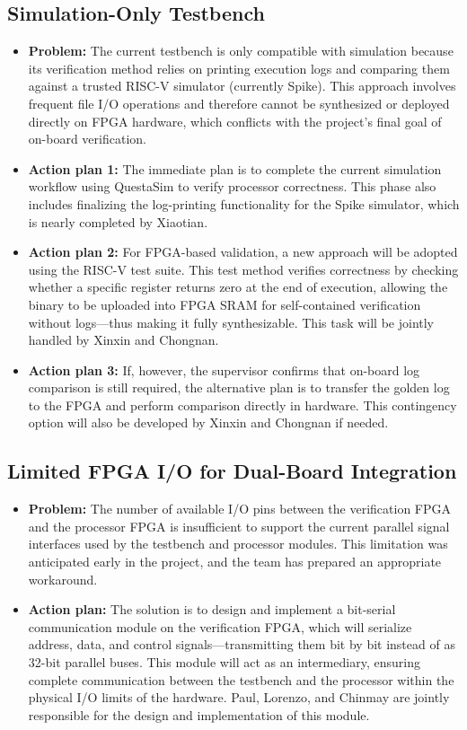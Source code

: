 \documentclass[10pt]{article}
\begin{document}
\subsection{Simulation-Only Testbench}
\begin{itemize}
    \item \textbf{Problem:} The current testbench is only compatible with simulation because its verification method relies on printing execution logs and comparing them against a trusted RISC-V simulator (currently Spike). This approach involves frequent file I/O operations and therefore cannot be synthesized or deployed directly on FPGA hardware, which conflicts with the project’s final goal of on-board verification.
    
    \item \textbf{Action plan 1:} The immediate plan is to complete the current simulation workflow using QuestaSim to verify processor correctness. This phase also includes finalizing the log-printing functionality for the Spike simulator, which is nearly completed by Xiaotian.
    \item \textbf{Action plan 2:} For FPGA-based validation, a new approach will be adopted using the RISC-V test suite. This test method verifies correctness by checking whether a specific register returns zero at the end of execution, allowing the binary to be uploaded into FPGA SRAM for self-contained verification without logs—thus making it fully synthesizable. This task will be jointly handled by Xinxin and Chongnan.
    \item \textbf{Action plan 3:} If, however, the supervisor confirms that on-board log comparison is still required, the alternative plan is to transfer the golden log to the FPGA and perform comparison directly in hardware. This contingency option will also be developed by Xinxin and Chongnan if needed.
\end{itemize}
\subsection{Limited FPGA I/O for Dual-Board Integration}
\begin{itemize}
    \item \textbf{Problem:} The number of available I/O pins between the verification FPGA and the processor FPGA is insufficient to support the current parallel signal interfaces used by the testbench and processor modules. This limitation was anticipated early in the project, and the team has prepared an appropriate workaround.
    
    \item \textbf{Action plan:} The solution is to design and implement a bit-serial communication module on the verification FPGA, which will serialize address, data, and control signals—transmitting them bit by bit instead of as 32-bit parallel buses. This module will act as an intermediary, ensuring complete communication between the testbench and the processor within the physical I/O limits of the hardware. Paul, Lorenzo, and Chinmay are jointly responsible for the design and implementation of this module.
\end{itemize}
\end{document}
